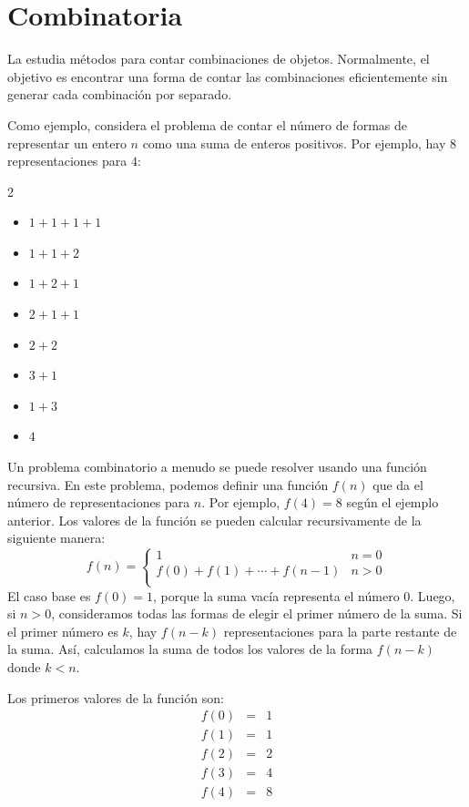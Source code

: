 \chapter{Combinatoria}


La  estudia métodos para contar
combinaciones de objetos.
Normalmente, el objetivo es encontrar una forma de
contar las combinaciones eficientemente
sin generar cada combinación por separado.

Como ejemplo, considera el problema
de contar el número de formas de
representar un entero $n$ como una suma de enteros positivos.
Por ejemplo, hay 8 representaciones
para $4$:
\begin{multicols}{2}
\begin{itemize}
\item $1+1+1+1$
\item $1+1+2$
\item $1+2+1$
\item $2+1+1$
\item $2+2$
\item $3+1$
\item $1+3$
\item $4$
\end{itemize}
\end{multicols}

Un problema combinatorio a menudo se puede resolver
usando una función recursiva.
En este problema, podemos definir una función $f(n)$
que da el número de representaciones para $n$.
Por ejemplo, $f(4)=8$ según el ejemplo anterior.
Los valores de la función
se pueden calcular recursivamente de la siguiente manera:
\begin{equation*}
    f(n) = \begin{cases}
               1               & n = 0\\
               f(0)+f(1)+\cdots+f(n-1) & n > 0\\
           \end{cases}
\end{equation*}
El caso base es $f(0)=1$,
porque la suma vacía representa el número 0.
Luego, si $n>0$, consideramos todas las formas de
elegir el primer número de la suma.
Si el primer número es $k$,
hay $f(n-k)$ representaciones
para la parte restante de la suma.
Así, calculamos la suma de todos los valores
de la forma $f(n-k)$ donde $k<n$.

Los primeros valores de la función son:
\[
\begin{array}{lcl}
f(0) & = & 1 \\
f(1) & = & 1 \\
f(2) & = & 2 \\
f(3) & = & 4 \\
f(4) & = & 8 \\
\end{array}
\]

